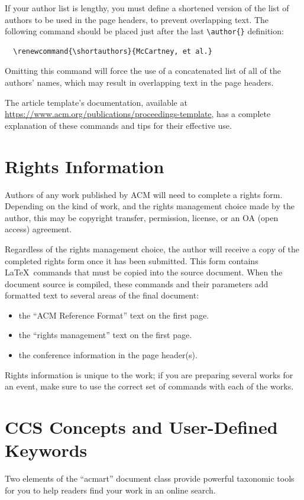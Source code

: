 \documentclass[sigconf]{acmart}
\begin{document}
If your author list is lengthy, you must define a shortened version of the list of authors to be used in the page headers, to prevent overlapping text. The following command should be placed just after the last \verb|\author{}| definition:
\begin{verbatim}
  \renewcommand{\shortauthors}{McCartney, et al.}
\end{verbatim}
Omitting this command will force the use of a concatenated list of all of the authors' names, which may result in overlapping text in the page headers.

The article template's documentation, available at  \url{https://www.acm.org/publications/proceedings-template}, has a complete explanation of these commands and tips for their effective use.

\section{Rights Information}

Authors of any work published by ACM will need to complete a rights form. Depending on the kind of work, and the rights management choice made by the author, this may be copyright transfer, permission, license, or an OA (open access) agreement.

Regardless of the rights management choice, the author will receive a copy of the completed rights form once it has been submitted. This form contains \LaTeX\ commands that must be copied into the source document. When the document source is compiled, these commands and their parameters add formatted text to several areas of the final document:
\begin{itemize}
\item the ``ACM Reference Format'' text on the first page.
\item the ``rights management'' text on the first page.
\item the conference information in the page header(s).
\end{itemize}

Rights information is unique to the work; if you are preparing several works for an event, make sure to use the correct set of commands with each of the works.

\section{CCS Concepts and User-Defined Keywords}

Two elements of the ``acmart'' document class provide powerful taxonomic tools for you to help readers find your work in an online search. 
\end{document}
